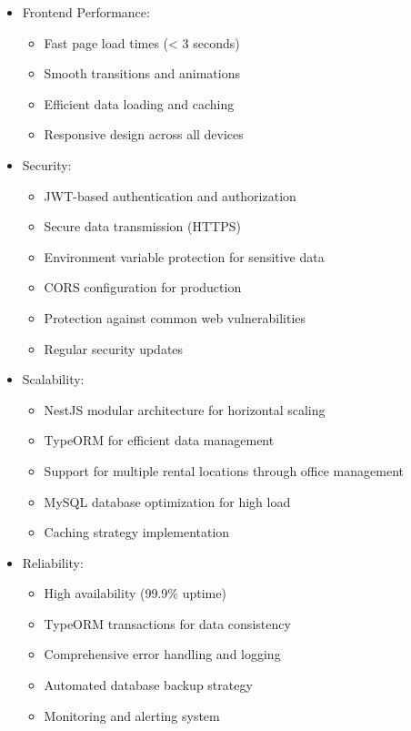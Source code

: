 \begin{itemize}
    \item Frontend Performance:
    \begin{itemize}
        \item Fast page load times (< 3 seconds)
        \item Smooth transitions and animations
        \item Efficient data loading and caching
        \item Responsive design across all devices
    \end{itemize}
    
    \item Security:
    \begin{itemize}
        \item JWT-based authentication and authorization
        \item Secure data transmission (HTTPS)
        \item Environment variable protection for sensitive data
        \item CORS configuration for production
        \item Protection against common web vulnerabilities
        \item Regular security updates
    \end{itemize}
    
    \item Scalability:
    \begin{itemize}
        \item NestJS modular architecture for horizontal scaling
        \item TypeORM for efficient data management
        \item Support for multiple rental locations through office management
        \item MySQL database optimization for high load
        \item Caching strategy implementation
    \end{itemize}
    
    \item Reliability:
    \begin{itemize}
        \item High availability (99.9\% uptime)
        \item TypeORM transactions for data consistency
        \item Comprehensive error handling and logging
        \item Automated database backup strategy
        \item Monitoring and alerting system
    \end{itemize}
    

\end{itemize}
